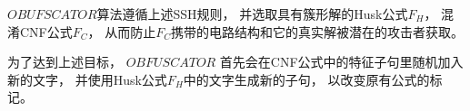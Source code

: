 %

$OBUFSCATOR$算法遵循上述SSH规则，
并选取具有簇形解的Husk公式$F_H$，
混淆CNF公式$F_C$，
从而防止$F_C$携带的电路结构和它的真实解被潜在的攻击者获取。

为了达到上述目标，
$OBFUSCATOR$ 首先会在CNF公式中的特征子句里随机加入新的文字，
并使用Husk公式$F_H$中的文字生成新的子句，
以改变原有公式的标记。


